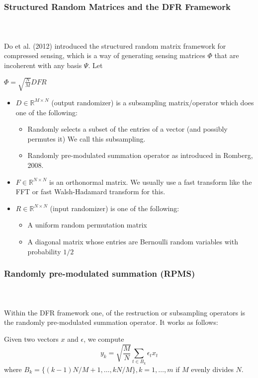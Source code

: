 


\begin{frame}[t]
	\frametitle{Structured Random Matrices and the DFR Framework}
	\framesubtitle{~~}  %

	Do et al. (2012) introduced the structured random matrix framework for compressed sensing,
	which is a way of generating sensing matrices $\Phi$ that are incoherent with any basis $\Psi$. Let 

	\centering
	$	\Phi = \sqrt{\frac{N}{M}}DFR$

	\begin{itemize}
	\item $D\in \mathbb{R}^{M\times N}$ (output randomizer) is a subsampling matrix/operator which does one of the following:
		\begin{itemize}
		\item Randomly selects a subset of the entries of a vector (and possibly permutes it) We call this subsampling.
		\item Randomly pre-modulated summation operator as introduced in Romberg, 2008.
		\end{itemize}
	\item $F\in\mathbb{R}^{N\times N}$ is an orthonormal matrix. We usually use a fast transform like the FFT or 
		fast Walsh-Hadamard transform for this.
	\item $R\in\mathbb{R}^{N\times N}$ (input randomizer) is one of the following:
		\begin{itemize}
			\item A uniform random permutation matrix
			\item A diagonal matrix whose entries are Bernoulli random variables with probability $1/2$
		\end{itemize}
	\end{itemize}

\end{frame}

\begin{frame}[t]
	\frametitle{Randomly pre-modulated summation (RPMS)}
	\framesubtitle{~~}  %
	
	Within the DFR framework one, of the restruction or subsampling operators is the
	randomly pre-modulated summation operator. It works as follows:

	Given two vectors $x$ and $\epsilon$, we compute
	\begin{equation}
		y_k = \sqrt{\frac{M}{N}}\sum_{t\in B_k}\epsilon_t x_t
	\end{equation}
	where
	$B_k = \{(k-1)N/M + 1, \ldots, kN/M  \}, k = 1,\ldots,m$ if $M$ evenly divides $N$.

\end{frame}


